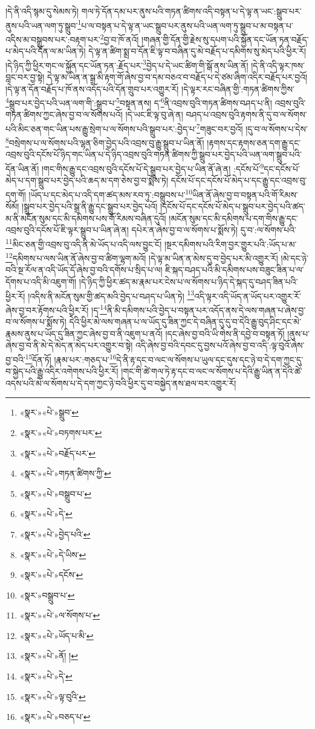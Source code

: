 །དེ་ནི་འདི་སྙམ་དུ་སེམས་ཏེ། གལ་ཏེ་དོན་དམ་པར་ནུས་པའི་གཏན་ཚིགས་འདི་བསྟན་པ་དེ་ལྟ་ན་ཡང་:སྒྲུབ་པར་ནུས་པའི་ཡན་ལག་ཏུ་སྒྲུབ་\footnote{«སྣར་»«པེ་»སྒྲུབ་}པ་ལ་བསྟན་པ་དེ་ལྟ་ན་ཡང་སྒྲུབ་པར་ནུས་པའི་ཡན་ལག་ཏུ་སྒྲུབ་པ་མ་བསྟན་པ་འདིས་མ་བསྒྲུབས་པར་:བརྟག་པར་\footnote{«སྣར་»«པེ་»བཏགས་པར་}བྱ་བ་ཁོ་ནའོ། །གཞན་གྱི་དོན་གྱི་རྗེས་སུ་དཔག་པའི་སྐྱོན་དང་ཡོན་ཏན་བརྗོད་པ་མེད་པའི་དོན་ལ་མ་ཡིན་ཏེ། དེ་ལྟ་ན་ཚིག་སྨྲ་བ་དོན་ཇི་ལྟ་བ་བཞིན་དུ་མེ་བརྗོད་པ་དམིགས་སུ་མེད་པའི་ཕྱིར་རོ། །དེ་ཉིད་ཀྱི་ཕྱིར་གང་ལ་སྐྱོན་དང་ཡོན་ཏན་:རྗོད་པར་\footnote{«སྣར་»«པེ་»བརྗོད་པར་}བྱེད་པ་དེ་ཡང་ཚིག་གི་སྒོ་ནས་ཡིན་ནོ། །དེ་ནི་འདི་ལྟར་ཁས་བླང་བར་བྱ་སྟེ། དེ་ལྟ་མ་ཡིན་ན་སྒྲ་མི་རྟག་གོ་ཞེས་བྱ་བ་དམ་བཅའ་བ་བརྗོད་པ་དེ་ཙམ་ཞིག་འདིར་བརྗོད་པར་བྱའོ། །དེ་ལྟ་ན་དོན་བརྗོད་པ་ཁོ་ནས་འདོད་པའི་དོན་གྲུབ་པར་འགྱུར་རོ། །དེ་ལྟར་རང་བཞིན་གྱི་:གཏན་ཚིགས་ཀྱིས་\footnote{«སྣར་»«པེ་»གཏན་ཚིགས་ཀྱི་}སྒྲུབ་པར་བྱེད་པའི་ཡན་ལག་གི་:སྒྲུབ་པ་\footnote{«སྣར་»«པེ་»བསྒྲུབ་པ་}བསྟན་ནས། ད་\footnote{«སྣར་»«པེ་»དེ་}ནི་འབྲས་བུའི་གཏན་ཚིགས་བཤད་པ་ནི། འབྲས་བུའི་གཏན་ཚིགས་ཀྱང་ཞེས་བྱ་བ་ལ་སོགས་པའོ། །དེ་ཡང་ཇི་ལྟ་བུ་ཞེ་ན། བཤད་པ་འབྲས་བུའི་རྟགས་ནི་དུ་བ་ལ་སོགས་པའི་མིང་ཅན་གང་ཡིན་པས་རྒྱུ་སྲེག་པ་ལ་སོགས་པའི་སྒྲུབ་པར་:བྱེད་པ་\footnote{«སྣར་»«པེ་»བྱེད་པའི་}གཟུང་བར་བྱའོ། །དུ་བ་ལ་སོགས་པ་དེས་\footnote{«སྣར་»«པེ་»དེ་ཡིས་}བསྲེགས་པ་ལ་སོགས་པའི་ལྷན་ཅིག་བྱེད་པའི་འབྲས་བུ་རྒྱུ་སྒྲུབ་པ་ཡིན་ནོ། །རྟགས་དང་རྟགས་ཅན་དག་རྒྱུ་དང་འབྲས་བུའི་དངོས་པོ་ཉིད་གང་ཡིན་པ་དེ་ཉིད་འབྲས་བུའི་གཏན་ཚིགས་ཀྱི་སྒྲུབ་པར་བྱེད་པའི་ཡན་ལག་སྒྲུབ་པའི་དོན་ཡིན་ནོ། །གང་གིས་རྒྱུ་དང་འབྲས་བུའི་དངོས་པོ་དེ་སྒྲུབ་པར་བྱེད་པ་ཡིན་ནོ་ཞེ་ན། :དངོས་པོ་\footnote{«སྣར་»«པེ་»དངོས་}དང་དངོས་པོ་མེད་པ་དག་སྒྲུབ་པར་བྱེད་པའི་ཆད་མ་དག་ཅེས་བྱ་བ་སྨོས་ཏེ། དངོས་པོ་དང་དངོས་པོ་མེད་པ་དང་རྒྱུ་དང་འབྲས་བུ་དག་གོ། །ཡོད་པ་དང་མེད་པ་འདི་དག་ཚད་མས་རབ་ཏུ་:བསྒྲུབས་པ་\footnote{«སྣར་»བསྒྲུབ་པ་}ཡིན་ནོ་ཞེས་བྱ་བ་བསྟན་པའི་གོ་རིམས་སོམོ། །སྒྲུབ་པར་བྱེད་པའི་སྒྲ་ནི་རྒྱུ་དང་སྒྲུབ་པར་བྱེད་པའོ། །དངོས་པོ་དང་དངོས་པོ་མེད་པ་སྒྲུབ་པར་བྱེད་པའི་ཚད་མ་ནི་མངོན་སུམ་དང་མི་དམིགས་པས་གོ་རིམས་བཞིན་དུའོ། །མངོན་སུམ་དང་མི་དམིགས་པ་དག་གིས་རྒྱུ་དང་འབྲས་བུའི་དངོས་པོ་ཇི་ལྟར་སྒྲུབ་པ་ཡིན་ཞེ་ན། དཔེར་ན་ཞེས་བྱ་བ་ལ་སོགས་པ་སྨོས་ཏེ། དུ་བ་:ལ་སོགས་པའི་\footnote{«སྣར་»«པེ་»ལ་སོགས་པ་}མིང་ཅན་གྱི་འབྲས་བུ་འདི་ནི་མེ་ཡོད་པ་འདི་ལས་བྱུང་ངོ། །སྔར་དམིགས་པའི་རིག་བྱར་གྱུར་པའི་:ཡོད་པ་མ་\footnote{«སྣར་»«པེ་»ཡོད་པ་མི་}དམིགས་པ་ལས་ཡིན་ནོ་ཞེས་བྱ་བ་ཚིག་ལྷག་མའོ། །དེ་ལྟ་མ་ཡིན་ན་མེས་དུ་བ་བྱེད་པར་མི་འགྱུར་རོ། །མེ་དང་ཉེ་བའི་སྔ་རོལ་ན་འདི་ཡོད་དོ་ཞེས་བྱ་བའི་དགོས་པ་སྲིད་པ་ལ། ཇི་སྐད་བཤད་པའི་མི་དམིགས་པས་བཟུང་ཟིན་པ་ལ་དོགས་པ་འདི་མི་འཇུག་གོ། །དེ་ཉིད་ཀྱི་ཕྱིར་ཚད་མ་རྣམ་པར་ངེས་པ་ལ་སོགས་པ་ཉིད་དེ་སྐད་དུ་བཤད་ཟིན་པའི་ཕྱིར་རོ། །འདིས་ནི་མངོན་སུམ་གྱི་ཚད་མའི་བྱེད་པ་བཤད་པ་ཡིན་ཏེ། \footnote{«སྣར་»«པེ་»ནོ། ། }འདི་ལྟར་འདི་ཡོད་ན་ཡོད་པར་འགྱུར་རོ་ཞེས་བྱ་བར་རྟོགས་པའི་ཕྱིར་རོ། །ད་\footnote{«སྣར་»«པེ་»དེ་}ནི་མི་དམིགས་པའི་བྱེད་པ་བསྟན་པར་འདོད་ནས་དེ་ལས་གཞན་པ་ཞེས་བྱ་བ་ལ་སོགས་པ་སྨོས་ཏེ། དེའི་ཕྱིར་མེ་ལས་གཞན་པ་ལ་ཡོད་དུ་ཟིན་ཀྱང་དེ་བཞིན་དུ་དུ་བ་དེའི་རྒྱུ་བུད་ཤིང་དང་མེ་རྣམས་ནུས་པ་ཡོད་དུ་ཟིན་ཀྱང་ཞེས་བྱ་བ་ནི་འཇུག་པ་ནའོ། །དང་ཞེས་བྱ་བའི་ཡི་གེས་ནི་དབྱེ་བ་བསྟན་ཏོ། །ནུས་པ་ཞེས་བྱ་བ་ནི་མེ་དེ་མེད་ན་མེད་པར་འགྱུར་བ་སྟེ། འདི་ཞེས་བྱ་བའི་དབང་དུ་བྱས་པའོ་ཞེས་བྱ་བ་འདི་:ལྟ་བུའོ་ཞེས་བྱ་བའི་\footnote{«སྣར་»«པེ་»ལྟ་བུའི་}དོན་ཏོ། །རྣམ་པར་:གཅད་པ་\footnote{«སྣར་»«པེ་»བཅད་པ་}དེ་ནི་རྟ་དང་བ་ལང་ལ་སོགས་པ་ཡུལ་དང་དུས་དང་ཉེ་བ་དེ་དག་ཀྱང་དུ་བ་སྐྱེད་པའི་རྒྱུ་འདིར་འགེགས་པའི་ཕྱིར་རོ། །གང་གི་ཚེ་གལ་ཏེ་རྟ་དང་བ་ལང་ལ་སོགས་པ་དེའི་རྒྱུ་ཡིན་ན་དེའི་ཚེ་འདས་པའི་མེ་ལ་སོགས་པ་དེ་དག་ཀྱང་ཉེ་བའི་ཕྱིར་དུ་བ་བསྐྱེད་ནས་ཐལ་བར་འགྱུར་རོ། 